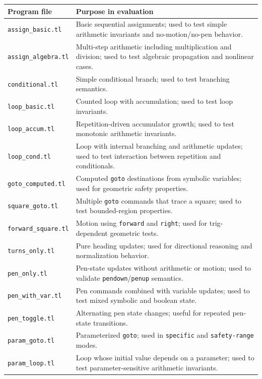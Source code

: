 \begin{longtable}{p{} p{}}
\toprule
\textbf{Program file} & \textbf{Purpose in evaluation} \\
\midrule
\texttt{assign\_basic.tl} & Basic sequential assignments; used to test simple arithmetic invariants and no-motion/no-pen behavior. \\
\texttt{assign\_algebra.tl} & Multi-step arithmetic including multiplication and division; used to test algebraic propagation and nonlinear cases. \\
\texttt{conditional.tl} & Simple conditional branch; used to test branching semantics. \\
\texttt{loop\_basic.tl} & Counted loop with accumulation; used to test loop invariants. \\
\texttt{loop\_accum.tl} & Repetition-driven accumulator growth; used to test monotonic arithmetic invariants. \\
\texttt{loop\_cond.tl} & Loop with internal branching and arithmetic updates; used to test interaction between repetition and conditionals. \\
\texttt{goto\_computed.tl} & Computed \texttt{goto} destinations from symbolic variables; used for geometric safety properties. \\
\texttt{square\_goto.tl} & Multiple \texttt{goto} commands that trace a square; used to test bounded-region properties. \\
\texttt{forward\_square.tl} & Motion using \texttt{forward} and \texttt{right}; used for trig-dependent geometric tests. \\
\texttt{turns\_only.tl} & Pure heading updates; used for directional reasoning and normalization behavior. \\
\texttt{pen\_only.tl} & Pen-state updates without arithmetic or motion; used to validate \texttt{pendown}/\texttt{penup} semantics. \\
\texttt{pen\_with\_var.tl} & Pen commands combined with variable updates; used to test mixed symbolic and boolean state. \\
\texttt{pen\_toggle.tl} & Alternating pen state changes; useful for repeated pen-state transitions. \\
\texttt{param\_goto.tl} & Parameterized \texttt{goto}; used in \texttt{specific} and \texttt{safety-range} modes. \\
\texttt{param\_loop.tl} & Loop whose initial value depends on a parameter; used to test parameter-sensitive arithmetic invariants. \\

\end{longtable}
